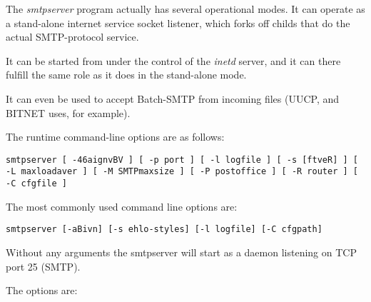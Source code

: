 
The {\em smtpserver} program actually has several operational modes.
It can operate as a stand-alone internet service socket listener, which
forks off childs that do the actual SMTP-protocol service.

It can be started from under the control of the {\em inetd} server, and
it can there fulfill the same role as it does in the stand-alone mode.

It can even be used to accept Batch-SMTP from incoming files (UUCP,
and BITNET uses, for example).

The runtime command-line options are as follows:

{\tt smtpserver [ -46aignvBV ] [ -p port ] [ -l logfile ] [ -s [ftveR] ] [ -L maxloadaver ] [ -M SMTPmaxsize ] [ -P postoffice ] [ -R router ] [ -C cfgfile ]}

The most commonly used command line options are:

{\tt smtpserver [-aBivn] [-s ehlo-styles] [-l logfile] [-C cfgpath]}

Without any arguments the  smtpserver  will start as a daemon
listening on TCP port 25 (SMTP).

The options are:

